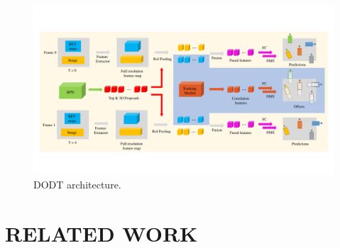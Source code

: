 \documentclass[letterpaper, 10 pt, conference]{ieeeconf}  %
\begin{document}

\begin{figure}
	\vspace{-0.6cm}
	\rule{0pt}{1ex}
	\begin{center}
		\includegraphics[trim={0.5cm, 2.5cm, 0.5cm, 2.5cm}, clip, width=\textwidth]{images/structure.pdf}
	\end{center}
	\caption{DODT architecture.}
	\label{fig:dodt}
	\vspace{-0.4cm}
\end{figure}

\section{RELATED WORK}
\end{document}
